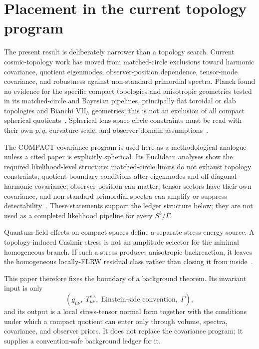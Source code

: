 \documentclass[
  aps,
  prd,
  reprint,
  superscriptaddress,
  floatfix,
  nofootinbib,
  longbibliography
]{revtex4-2}
\theoremstyle{plain}
\theoremstyle{definition}
\theoremstyle{remark}
\newcommand{\vis}{\mathrm{vis}}
\begin{document}
\section{Placement in the current topology program}

The present result is deliberately narrower than a topology search.  Current
cosmic-topology work has moved from matched-circle exclusions toward harmonic
covariance, quotient eigenmodes, observer-position dependence, tensor-mode
covariance, and robustness against non-standard primordial spectra.  Planck
found no evidence for the specific compact topologies and anisotropic geometries
tested in its matched-circle and Bayesian pipelines, principally flat toroidal
or slab topologies and Bianchi VII\(_h\) geometries; this is not an exclusion of
all compact spherical quotients~\cite{PlanckTopology}.  Spherical lens-space
circle constraints must be read with their own \(p,q\), curvature-scale, and
observer-domain assumptions~\cite{SahaLens}.

The COMPACT covariance program is used here as a methodological analogue unless
a cited paper is explicitly spherical.  Its Euclidean analyses show the required
likelihood-level structure: matched-circle limits do not exhaust topology
constraints, quotient boundary conditions alter eigenmodes and off-diagonal
harmonic covariance, observer position can matter, tensor sectors have their own
covariance, and non-standard primordial spectra can amplify or suppress
detectability~\cite{COMPACTPartI,COMPACTIIa,COMPACTIIb,COMPACTIIIb,
COMPACTIIc}.  These statements support the ledger structure below; they are not
used as a completed likelihood pipeline for every \(S^3/\Gamma\).

Quantum-field effects on compact spaces define a separate stress-energy source.
A topology-induced Casimir stress is not an amplitude selector for the minimal
homogeneous branch.  If such a stress produces anisotropic backreaction, it
leaves the homogeneous locally-FLRW residual class rather than closing it from
inside~\cite{NegroCasimir}.

This paper therefore fixes the boundary of a background theorem.  Its invariant
input is only
\[
(g_{\mu\nu},\;T^{\vis}_{\mu\nu},\;\text{Einstein-side convention},\;\Gamma),
\]
and its output is a local stress-tensor normal form together with the conditions
under which a compact quotient can enter only through volume, spectra,
covariance, and observer priors.  It does not replace the covariance program;
it supplies a convention-safe background ledger for it.
\end{document}

